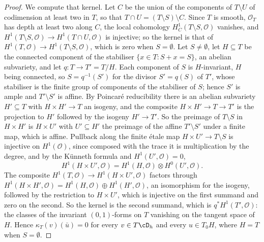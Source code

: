 \begin{proof}
We compute that kernel. Let $C$ be the union of the components of $T\setminus U$ of codimension at least two in $T$, so that $T\cap U=(T\setminus S)\setminus C$. Since $T$ is smooth, $\mathcal{O}_{T}$ has depth at least two along $C$, the local cohomology $H^{1}_{C}(T\setminus S,\mathcal{O})$ vanishes, and $H^{1}(T\setminus S,\mathcal{O})\to H^{1}(T\cap U,\mathcal{O})$ is injective; so the kernel is that of $H^{1}(T,\mathcal{O})\to H^{1}(T\setminus S,\mathcal{O})$, which is zero when $S=\emptyset$. Let $S\ne\emptyset$, let $H\subseteq T$ be the connected component of the stabiliser $\{x\in T:S+x=S\}$, an abelian subvariety, and let $q\colon T\to T'=T/H$. Each component of $S$ is $H$-invariant, $H$ being connected, so $S=q^{-1}(S')$ for the divisor $S'=q(S)$ of $T'$, whose stabiliser is the finite group of components of the stabiliser of $S$; hence $S'$ is ample \cite[\S6, Application~1]{Mum70} and $T'\setminus S'$ is affine. By Poincar\'e reducibility there is an abelian subvariety $H'\subseteq T$ with $H\times H'\to T$ an isogeny, and the composite $H\times H'\to T\to T'$ is the projection to $H'$ followed by the isogeny $H'\to T'$. So the preimage of $T\setminus S$ in $H\times H'$ is $H\times U'$ with $U'\subseteq H'$ the preimage of the affine $T'\setminus S'$ under a finite map, which is affine. Pullback along the finite \'etale map $H\times U'\to T\setminus S$ is injective on $H^{1}(\mathcal{O})$, since composed with the trace it is multiplication by the degree, and by the K\"unneth formula and $H^{1}(U',\mathcal{O})=0$,
\[
H^{1}(H\times U',\mathcal{O})=H^{1}(H,\mathcal{O})\otimes H^{0}(U',\mathcal{O}).
\]
The composite $H^{1}(T,\mathcal{O})\to H^{1}(H\times U',\mathcal{O})$ factors through $H^{1}(H\times H',\mathcal{O})=H^{1}(H,\mathcal{O})\oplus H^{1}(H',\mathcal{O})$, an isomorphism for the isogeny, followed by the restriction to $H\times U'$, which is injective on the first summand and zero on the second. So the kernel is the second summand, which is $q^{*}H^{1}(T',\mathcal{O})$: the classes of the invariant $(0,1)$-forms on $T$ vanishing on the tangent space of $H$. Hence $\kappa_{T}(v)(\bar u)=0$ for every $v\in T\cD_{h}$ and every $u\in T_{0}H$, where $H=T$ when $S=\emptyset$.


\end{proof}
